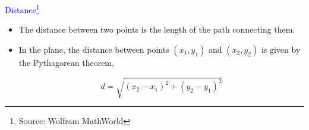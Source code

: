 \documentclass[a4paper,landscape]{slides}
\begin{document}
\begin{slide}

\textcolor{blue}{\Large{Distance}\footnote{Source: Wolfram MathWorld}}

\begin{itemize}

\item{The distance between two points is the length of the path connecting them.}

\item In the plane, the distance between points $(x_1, y_1)$ and $(x_2, y_2)$ is given by the Pythagorean theorem,

$$d=\sqrt{(x_2-x_1)^2+(y_2-y_1)^2}$$

\end{itemize}

\end{slide}
\end{document}
